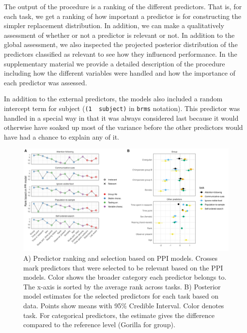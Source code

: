 \documentclass[
  man,floatsintext]{apa6}
\begin{document}
The output of the procedure is a ranking of the different predictors. That is, for each task, we get a ranking of how important a predictor is for constructing the simpler replacement distribution. In addition, we can make a qualitatively assessment of whether or not a predictor is relevant or not. In addition to the global assessment, we also inspected the projected posterior distribution of the predictors classified as relevant to see how they influenced performance. In the supplementary material we provide a detailed description of the procedure including how the different variables were handled and how the importance of each predictor was assessed.

In addition to the external predictors, the models also included a random intercept term for subject (\texttt{(1\ \textbar{}\ subject)} in \texttt{brms} notation). This predictor was handled in a special way in that it was always considered last because it would otherwise have soaked up most of the variance before the other predictors would have had a chance to explain any of it.

\begin{figure}

{\centering \includegraphics[width=1\linewidth]{../visuals/pred_sum} 

}

\caption{A) Predictor ranking and selection based on PPI models. Crosses mark predictors that were selected to be relevant based on the PPI models. Color shows the broader category each predictor belongs to. The x-axis is sorted by the average rank across tasks. B) Posterior model estimates for the selected predictors for each task based on data. Points show means with 95\% Credible Interval. Color denotes task. For categorical predictors, the estimate gives the difference compared to the reference level (Gorilla for group).}\label{fig:figpred}
\end{figure}
\end{document}
